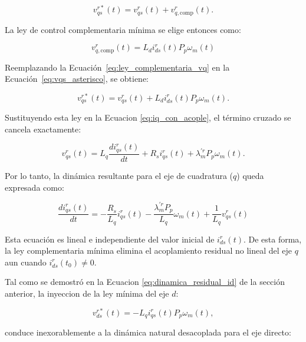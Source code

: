 \documentclass[10pt,a4paper]{article}
\begin{document}
\begin{equation}
    v_{qs}^{r*}(t)=v_{qs}^{r}(t)+v_{q,\mathrm{comp}}^{r}(t).
    \label{eq:vqs_asterisco}
\end{equation}

La ley de control complementaria mínima se elige entonces como:

\begin{equation}
    v_{q,\mathrm{comp}}^{r}(t)
    =L_d i_{ds}^{r}(t)P_p\omega_m(t)
    \label{eq:ley_complementaria_vq}
\end{equation}

Reemplazando la Ecuación~\eqref{eq:ley_complementaria_vq} en la Ecuación~\eqref{eq:vqs_asterisco}, se obtiene:

\begin{equation}
    v_{qs}^{r*}(t)
    =
    v_{qs}^{r}(t)
    +L_d i_{ds}^{r}(t)P_p\omega_m(t).
    \label{eq:vqs_sustituida}
\end{equation}

Sustituyendo esta ley en la Ecuacion \eqref{eq:iq_con_acople}, el término cruzado se cancela exactamente:

\begin{equation*}
	v_{qs}^{r}(t)
	=
	L_q\frac{di_{qs}^{r}(t)}{dt}
	+R_s i_{qs}^{r}(t)
	+\lambda_m^{\prime r}P_p\omega_m(t).
\end{equation*}

Por lo tanto, la dinámica resultante para el eje de cuadratura ($q$) queda expresada como:

\begin{equation}
	\boxed{
		\frac{di_{qs}^{r}(t)}{dt}
		=
		-\frac{R_s}{L_q}i_{qs}^{r}(t)
		-\frac{\lambda_m^{\prime r}P_p}{L_q}\omega_m(t)
		+\frac{1}{L_q}v_{qs}^{r}(t)
	}
	\label{eq:iq_desacoplado}
\end{equation}

Esta ecuación es lineal e independiente del valor inicial de $i_{ds}^{r}(t)$. 
De esta forma, la ley complementaria mínima elimina el acoplamiento residual no lineal del eje $q$ aun cuando $i_{ds}^{r}(t_0)\neq 0$.

Tal como se demostró en la Ecuacion \eqref{eq:dinamica_residual_id} de la sección anterior, la inyeccion de la ley mínima del eje $d$:

\begin{equation*}
	v_{ds}^{r*}(t)=-L_q i_{qs}^{r}(t)P_p\omega_m(t),
\end{equation*}

conduce inexorablemente a la dinámica natural desacoplada para el eje directo:
\end{document}
